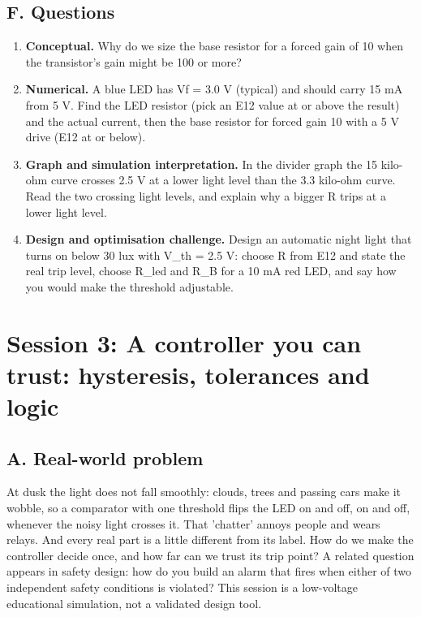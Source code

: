 \documentclass[11pt,a4paper]{article}
\begin{document}
\subsection*{F. Questions}
\begin{enumerate}[nosep]
\item \textbf{Conceptual.} Why do we size the base resistor for a forced gain of 10 when the transistor's gain might be 100 or more?
\item \textbf{Numerical.} A blue LED has Vf = 3.0 V (typical) and should carry 15 mA from 5 V. Find the LED resistor (pick an E12 value at or above the result) and the actual current, then the base resistor for forced gain 10 with a 5 V drive (E12 at or below).
\item \textbf{Graph and simulation interpretation.} In the divider graph the 15 kilo-ohm curve crosses 2.5 V at a lower light level than the 3.3 kilo-ohm curve. Read the two crossing light levels, and explain why a bigger R trips at a lower light level.
\item \textbf{Design and optimisation challenge.} Design an automatic night light that turns on below 30 lux with V\_th = 2.5 V: choose R from E12 and state the real trip level, choose R\_led and R\_B for a 10 mA red LED, and say how you would make the threshold adjustable.
\end{enumerate}

\section{Session 3: A controller you can trust: hysteresis, tolerances and logic}

\subsection*{A. Real-world problem}
At dusk the light does not fall smoothly: clouds, trees and passing cars make it wobble, so a comparator with one threshold flips the LED on and off, on and off, whenever the noisy light crosses it. That 'chatter' annoys people and wears relays. And every real part is a little different from its label. How do we make the controller decide once, and how far can we trust its trip point? A related question appears in safety design: how do you build an alarm that fires when either of two independent safety conditions is violated? This session is a low-voltage educational simulation, not a validated design tool.
\end{document}
